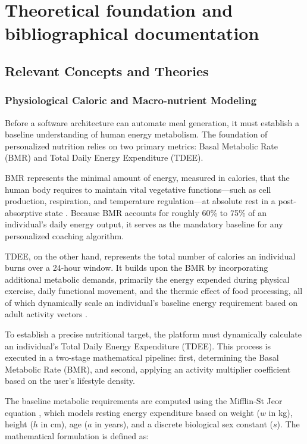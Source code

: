 \chapter{Theoretical foundation and bibliographical documentation}
\label{cap:cap2}

\section{Relevant Concepts and Theories}

\subsection{Physiological Caloric and Macro-nutrient Modeling}
Before a software architecture can automate meal generation, it must establish a baseline 
understanding of human energy metabolism. The foundation of personalized nutrition relies 
on two primary metrics: Basal Metabolic Rate (BMR) and Total Daily Energy Expenditure 
(TDEE).

BMR represents the minimal amount of energy, measured in calories, that the human body requires 
to maintain vital vegetative functions—such as cell production, respiration, and temperature 
regulation—at absolute rest in a post-absorptive state \cite[Ch.~2]{techreport:fao:energy}. 
Because BMR accounts for roughly 60\% to 75\% of an individual's daily energy output, it serves 
as the mandatory baseline for any personalized coaching algorithm.

TDEE, on the other hand, represents the total number of calories an individual burns 
over a 24-hour window. It builds upon the BMR by incorporating additional metabolic 
demands, primarily the energy expended during physical exercise, daily functional movement, 
and the thermic effect of food processing, all of which dynamically scale an individual's 
baseline energy requirement based on adult activity vectors \cite[Ch.~5]{techreport:fao:energy}.

To establish a precise nutritional target, the platform must dynamically calculate an 
individual's Total Daily Energy Expenditure (TDEE). This process is executed in a 
two-stage mathematical pipeline: first, determining the Basal Metabolic Rate (BMR), 
and second, applying an activity multiplier coefficient based on the user's lifestyle 
density.

The baseline metabolic requirements are computed using the Mifflin-St Jeor 
equation \cite{Mifflin1990}, which models resting energy expenditure based on 
weight ($w$ in kg), height ($h$ in cm), age ($a$ in years), and a discrete biological sex 
constant ($s$). The mathematical formulation is defined as:

